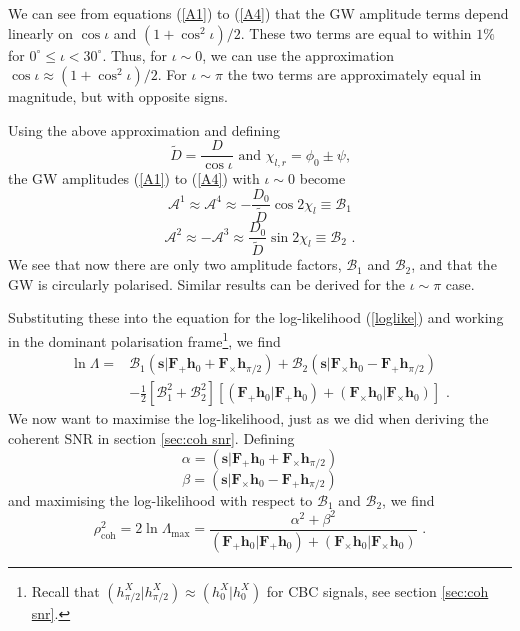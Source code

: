 \documentclass[11pt]{cuthesis}
\newcommand{\fs}{\text{ .}}
\begin{document}
We can see from equations (\ref{A1}) to (\ref{A4}) that the GW amplitude terms depend linearly on $\cos\iota$ and $(1+\cos^2\iota)/2$. These two terms are equal to within $1\%$ for $0^\circ\leq\iota<30^\circ$. Thus, for $\iota \sim 0$, we can use the approximation $\cos\iota \approx (1+\cos^2\iota)/2$. For $\iota \sim \pi$ the two terms are approximately equal in magnitude, but with opposite signs. 

Using the above approximation and defining 
\begin{equation}
\tilde{D} = \frac{D}{\cos\iota} \text{   and   } \chi_{l,r} = \phi_0 \pm \psi \text{,} 
\end{equation}
the GW amplitudes  (\ref{A1}) to (\ref{A4}) with $\iota\sim 0$ become
\begin{equation}
\mathcal{A}^1 \approx \mathcal{A}^4 \approx -\frac{D_0}{\tilde{D}} \cos 2\chi_l \equiv \mathcal{B}_1
\end{equation}
\begin{equation}
\mathcal{A}^2 \approx -\mathcal{A}^3 \approx \frac{D_0}{\tilde{D}} \sin 2\chi_l \equiv \mathcal{B}_2 \fs
\end{equation}
We see that now there are only two amplitude factors, $\mathcal{B}_1$ and $\mathcal{B}_2$, and that the GW is circularly polarised. Similar results can be derived for the $\iota \sim \pi$ case. 

Substituting these into the equation for the log-likelihood (\ref{loglike}) and working in the dominant polarisation frame\footnote{Recall that $(h_{\pi/2}^X|h_{\pi/2}^X)\approx (h_0^X|h_0^X)$ for CBC signals, see section \ref{sec:coh snr}.}, we find
\begin{align} 
\ln \Lambda = & \mathcal{B}_1 (\textbf{s}|\textbf{F}_+\textbf{h}_0 + \textbf{F}_\times \textbf{h}_{\pi /2} ) + \mathcal{B}_2  (\textbf{s}|\textbf{F}_\times\textbf{h}_0 - \textbf{F}_+ \textbf{h}_{\pi /2} ) \\ & - \frac{1}{2} [\mathcal{B}_1^2 + \mathcal{B}_2^2 ] [ (\textbf{F}_+\textbf{h}_0|\textbf{F}_+\textbf{h}_0) + (\textbf{F}_\times \textbf{h}_0|\textbf{F}_\times \textbf{h}_0) ] \fs
\end{align}
We now want to maximise the log-likelihood, just as we did when deriving the coherent SNR in section \ref{sec:coh snr}.  Defining 
\begin{equation}
\alpha = (\textbf{s}|\textbf{F}_+\textbf{h}_0 + \textbf{F}_\times \textbf{h}_{\pi /2} )
\end{equation}
\begin{equation}
\beta =  (\textbf{s}|\textbf{F}_\times\textbf{h}_0 - \textbf{F}_+ \textbf{h}_{\pi /2} ) 
\end{equation}
and maximising the log-likelihood with respect to $\mathcal{B}_1$ and $\mathcal{B}_2$, we find 
\begin{equation}
\rho_\text{coh}^2 = 2\ln \Lambda_\text{max} = \frac{\alpha^2 + \beta^2}{ (\textbf{F}_+\textbf{h}_0|\textbf{F}_+\textbf{h}_0) + (\textbf{F}_\times \textbf{h}_0|\textbf{F}_\times \textbf{h}_0)} \fs
\end{equation}
\end{document}
